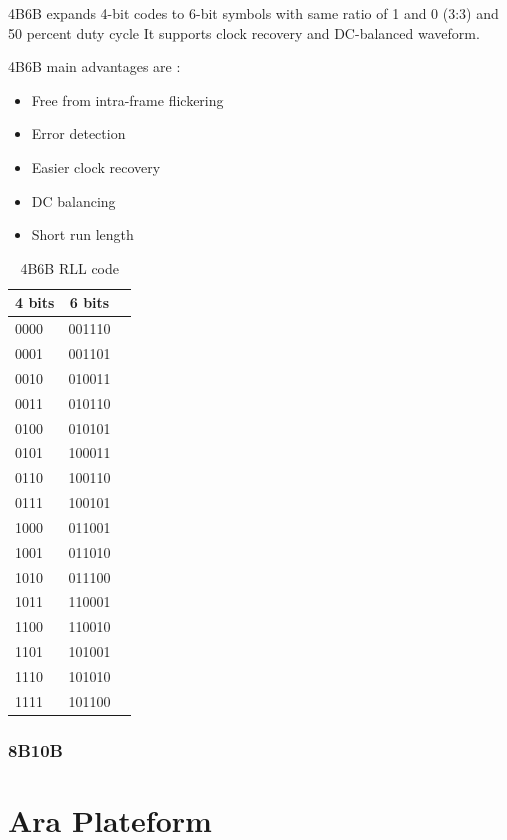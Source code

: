 4B6B expands 4-bit codes to 6-bit symbols with same ratio of 1 and 0 (3:3) and 50 percent duty cycle
It supports clock recovery and DC-balanced waveform.

4B6B main advantages are : 

\begin{itemize}
\item Free from intra-frame flickering
\item Error detection
\item Easier clock recovery
\item DC balancing
\item Short run length
\end{itemize}

\begin{table}[htbp]
\begin{center}
\begin{tabular}{|l|c|r|}
  \hline
  4 bits & 6 bits \\
  \hline
  0000 & 001110 \\
  0001 & 001101 \\
  0010 & 010011 \\
  0011 & 010110 \\
  0100 & 010101 \\
  0101 & 100011 \\
  0110 & 100110 \\
  0111 & 100101 \\
  1000 & 011001 \\
  1001 & 011010 \\
  1010 & 011100 \\
  1011 & 110001 \\
  1100 & 110010 \\
  1101 & 101001 \\
  1110 & 101010 \\
  1111 & 101100 \\
  \hline
\end{tabular}
\end{center}
\caption{4B6B RLL code}
\label{tab:4b6b}
\end{table}

\subsubsection{8B10B}


\section{Ara Plateform}

